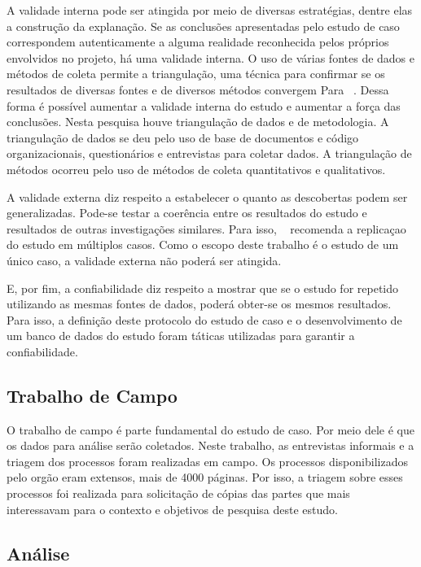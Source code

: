 A validade interna pode ser atingida por meio de diversas estratégias, dentre elas a construção da explanação. Se as conclusões apresentadas pelo estudo de caso correspondem autenticamente a alguma realidade reconhecida pelos próprios envolvidos no projeto, há uma validade interna. O uso de várias fontes de dados e métodos de coleta permite a triangulação, uma técnica para confirmar se os resultados
de diversas fontes e de diversos métodos convergem Para ~\cite{yin}. Dessa forma é possível aumentar a
validade interna do estudo e aumentar a força das conclusões. Nesta pesquisa houve
triangulação de dados  e de metodologia. A triangulação de dados se deu
pelo uso de base de documentos e código organizacionais, questionários e entrevistas para coletar dados. A triangulação
de métodos ocorreu pelo uso de métodos de coleta quantitativos e qualitativos.

A validade externa diz respeito a estabelecer o quanto as descobertas podem ser generalizadas. Pode-se testar a coerência entre os resultados
do estudo e resultados de outras investigações similares. Para isso, ~\cite{yin} recomenda a replicaçao do estudo em múltiplos casos. Como o escopo deste trabalho é o estudo de um único caso, a validade externa não poderá ser atingida.

E, por fim, a confiabilidade diz respeito a mostrar que se o estudo for repetido utilizando as mesmas fontes de dados, poderá obter-se os mesmos resultados. Para isso, a definição deste protocolo do estudo de caso e o 
desenvolvimento de um banco de dados do estudo foram táticas utilizadas para garantir a confiabilidade.


\subsection[Trabalho de Campo]{Trabalho de Campo}

O trabalho de campo é parte fundamental do estudo de caso. Por meio dele é que os dados para análise serão coletados. Neste trabalho, as entrevistas informais e a triagem dos processos foram realizadas em campo. Os processos disponibilizados pelo orgão eram extensos, mais de 4000 páginas. Por isso, a triagem sobre esses processos foi realizada para solicitação de cópias das partes que mais interessavam para o contexto e objetivos de pesquisa deste estudo.

\subsection[Análise]{Análise} 

